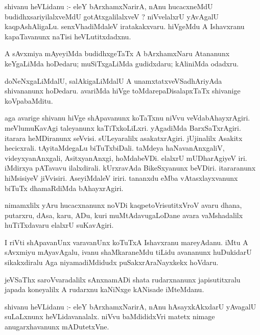 \documentclass{article}
\begin{document}
\begin{mn}
shivanu heVLidanu :- eleY bArxhamxNarirA,  nAnu  hucacxneMdU budidhxsariyilalxveMdU  
gotAtxgalilalxveV ?  niVvelalxrU  yAvAgalU kaqpAshAligaLu. senxVhadiMdaleV iratakakxvaru.  
hiVgeMdu A Ishavxranu kapaTavanunx naTisi heVLutitxdadxnu.
\end{mn}

\begin{mn}
A sAvxmiya mAyeyiMda budidhxgeTaTx A bArxhamxNaru Atananunx keYgaLiMda hoDedaru; 
muSiTxgaLiMda gudidxdaru; kAliniMda odadxru.
\end{mn}

\begin{mn}
doNeNxgaLiMdalU, salAkigaLiMdalU A unamxtatxveVSadhAriyAda shivananunx hoDedaru.  
avariMda hiVge  toMdarepaDisalapxTaTx  shivanige koVpabaMditu.
\end{mn}

\begin{mn}
aga avarige shivanu hiVge shApavanunx koTaTxnu  niVvu veVdabAhayxrAgiri.  meVlumuKavAgi  
taleyanunx  kaTiTxkoLiLxri.  yAgadiMda BarxSaTxrAgiri.  itarara heMDiranunx seVvisi.  
sULeyaralilx asakatxrAgiri.  jUjinalilx Asakitx hecicxrali.  tAyitaMdegaLu  biTuTxbiDali.  
taMdeya  haNavanAnxgaliV,  videyxyanAnxgali, AsitxyanAnxgi, hoMdabeVDi.  elalxrU 
mUDharAgiyeV iri. iMdirxya pATavavu  ilalxdirali.  kUrxravAda BikeSxyanunx beVDiri.  itararanunx 
hiMsisiyeV jiVvisiri.  AseyiMdaleV iriri.  tananxdu eMba vAtasxlayxvanunx biTuTx dhamaRdiMda bAhayxrAgiri.
\end{mn}

\begin{mn}
nimamxlilx yAru hucacxnanunx noVDi kaqpetoVrisutitxVroV avaru dhana, putarxru, dAsa,  karu,  
ADu,  kuri  muMtAdavugaLoDane  avara vaMshadalilx  huTiTxdavaru elalxrU  suKavAgiri.
\end{mn}

\begin{mn}
I riVti shApavanUnx  varavanUnx  koTuTxA Ishavxranu mareyAdanu.  iMtu A sAvxmiyu mAyavAgalu,  ivanu  
shaMkaraneMdu tiLidu avananunx  huDukidarU  sikakxdiralu  Aga niyamadiMdidudx puSakxrAraNayxkekx hoVdaru.
\end{mn}

\begin{mn}
jeVSaThx saroVvaradalilx sAnxnamADi  shata rudarxnanunx  japisutitxralu japada koneyalilx 
A rudarxnu kaNiNxge kANisade  iMteMdanu.
\end{mn}

\begin{mn}
shivanu heVLidanu :- eleY bArxhamxNarirA,  nAnu  hAsayxkAkxdarU  yAvagalU  suLaLxnunx  
heVLidavanalalx.  niVvu  baMdididxVri  matetx nimage anugarxhavanunx  mADutetxVne.
\end{mn}
\end{document}
